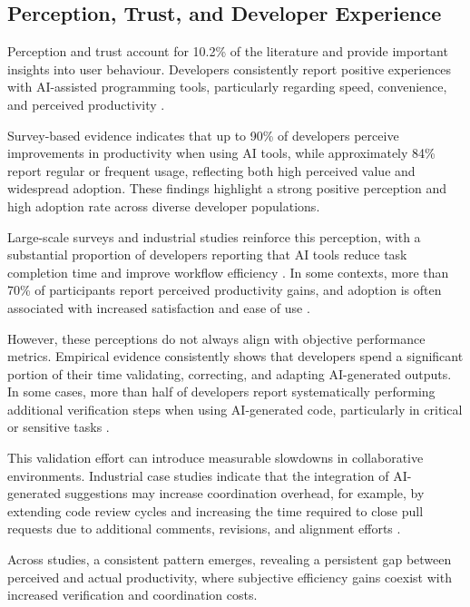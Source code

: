 \documentclass[conference]{IEEEtran}
\begin{document}
\subsection{Perception, Trust, and Developer Experience}

Perception and trust account for 10.2\% of the literature and provide important insights into user behaviour. Developers consistently report positive experiences with AI-assisted programming tools, particularly regarding speed, convenience, and perceived productivity \cite{lyu_my_2025}.

Survey-based evidence indicates that up to 90\% of developers perceive improvements in productivity when using AI tools, while approximately 84\% report regular or frequent usage, reflecting both high perceived value and widespread adoption. These findings highlight a strong positive perception and high adoption rate across diverse developer populations.

Large-scale surveys and industrial studies reinforce this perception, with a substantial proportion of developers reporting that AI tools reduce task completion time and improve workflow efficiency \cite{bakal_experience_2025}. In some contexts, more than 70\% of participants report perceived productivity gains, and adoption is often associated with increased satisfaction and ease of use \cite{vaillant_developers_2024}.

However, these perceptions do not always align with objective performance metrics. Empirical evidence consistently shows that developers spend a significant portion of their time validating, correcting, and adapting AI-generated outputs. In some cases, more than half of developers report systematically performing additional verification steps when using AI-generated code, particularly in critical or sensitive tasks \cite{madampe_how_2025}.

This validation effort can introduce measurable slowdowns in collaborative environments. Industrial case studies indicate that the integration of AI-generated suggestions may increase coordination overhead, for example, by extending code review cycles and increasing the time required to close pull requests due to additional comments, revisions, and alignment efforts \cite{cihan_automated_2024}.

Across studies, a consistent pattern emerges, revealing a persistent gap between perceived and actual productivity, where subjective efficiency gains coexist with increased verification and coordination costs.
\end{document}
